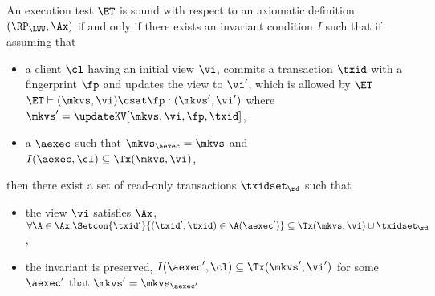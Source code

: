 \begin{definition}
\label{def:et_sound}
An execution test $\ET$ is sound with respect to an axiomatic 
definition $(\RP_{\LWW}, \Ax)$ if and only if
there exists an invariant condition $I$ such that 
if assuming that
\begin{itemize}
    \item a client \( \cl \) having an initial view \( \vi \), 
        commits a transaction \( \txid \) with a fingerprint \( \fp \) and updates the view to \( \vi' \), 
        which is allowed by \( \ET \) \ie $\ET \vdash (\mkvs, \vi) \csat \fp: (\mkvs',\vi')$ where \( \mkvs' = \updateKV[\mkvs, \vi ,\fp, \txid]\),
    \item a $\aexec$ such that $\mkvs_{\aexec} = \mkvs$ and $I(\aexec, \cl) \subseteq \Tx(\mkvs, \vi)$,
\end{itemize}
then there exist a set of read-only transactions $\txidset_{\rd}$ such that 
\begin{itemize}
\item the view \( \vi \) satisfies \( \Ax \), \ie $\forall \A \in \Ax. \Setcon{\txid' }{ (\txid', \txid) \in \A(\aexec')} \subseteq \Tx(\mkvs, \vi) \cup \txidset_{\rd}$, 
\item the invariant is preserved, \ie $I(\aexec', \cl) \subseteq \Tx(\mkvs', \vi')$ for some \( \aexec' \) that \( \mkvs' = \mkvs_{\aexec'}\)
\end{itemize}
\end{definition}

